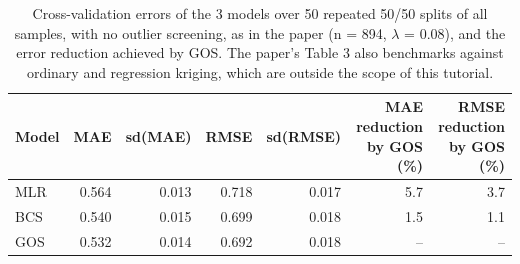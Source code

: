\begin{table}[t]\centering
\caption{Cross-validation errors of the 3 models over 50 repeated 50/50 splits of all samples, with no outlier screening, as in the paper (n = 894, $\lambda$ = 0.08), and the error reduction achieved by GOS. The paper's Table 3 also benchmarks against ordinary and regression kriging, which are outside the scope of this tutorial.}\label{tab:models-noscreen}
\begin{tabular}{lrrrrrr}
\hline
Model & MAE & sd(MAE) & RMSE & sd(RMSE) & MAE reduction by GOS (\%) & RMSE reduction by GOS (\%) \\
\hline
MLR & 0.564 & 0.013 & 0.718 & 0.017 & 5.7 & 3.7 \\
BCS & 0.540 & 0.015 & 0.699 & 0.018 & 1.5 & 1.1 \\
GOS & 0.532 & 0.014 & 0.692 & 0.018 & -- & -- \\
\hline
\end{tabular}\end{table}
